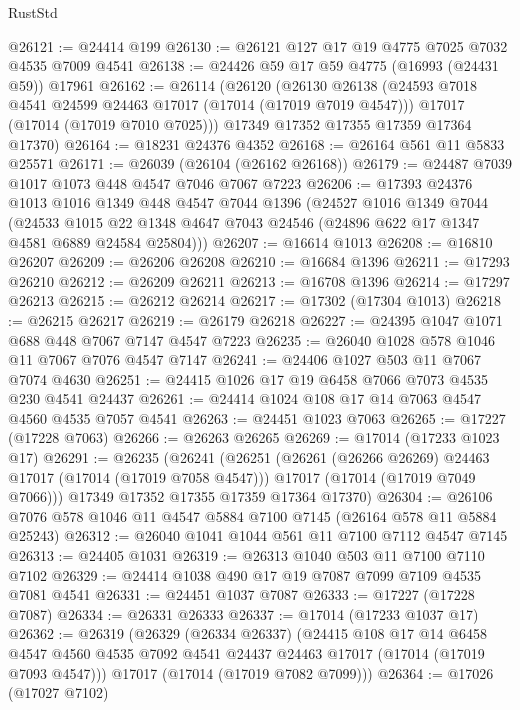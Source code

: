 \begin{lexlean}{RustStd}
\begin{coremodule}
@26121 := @24414 @199
@26130 := @26121 @127 @17 @19 @4775 @7025 @7032 @4535 @7009 @4541
@26138 := @24426 @59 @17 @59 @4775 (@16993 (@24431 @59)) @17961
@26162 := @26114
    (@26120
      (@26130
        @26138
        (@24593 @7018 @4541 @24599 @24463 @17017 (@17014 (@17019 @7019 @4547)))
        @17017
        (@17014 (@17019 @7010 @7025)))
      @17349
      @17352
      @17355
      @17359
      @17364
      @17370)
@26164 := @18231 @24376 @4352
@26168 := @26164 @561 @11 @5833 @25571
@26171 := @26039 (@26104 (@26162 @26168))
@26179 := @24487 @7039 @1017 @1073 @448 @4547 @7046 @7067 @7223
@26206 := @17393
    @24376
    @1013
    @1016
    @1349
    @448
    @4547
    @7044
    @1396
    (@24527
      @1016
      @1349
      @7044
      (@24533 @1015 @22 @1348 @4647 @7043 @24546 (@24896 @622 @17 @1347 @4581 @6889 @24584 @25804)))
@26207 := @16614 @1013
@26208 := @16810 @26207
@26209 := @26206 @26208
@26210 := @16684 @1396
@26211 := @17293 @26210
@26212 := @26209 @26211
@26213 := @16708 @1396
@26214 := @17297 @26213
@26215 := @26212 @26214
@26217 := @17302 (@17304 @1013)
@26218 := @26215 @26217
@26219 := @26179 @26218
@26227 := @24395 @1047 @1071 @688 @448 @7067 @7147 @4547 @7223
@26235 := @26040 @1028 @578 @1046 @11 @7067 @7076 @4547 @7147
@26241 := @24406 @1027 @503 @11 @7067 @7074 @4630
@26251 := @24415 @1026 @17 @19 @6458 @7066 @7073 @4535 @230 @4541 @24437
@26261 := @24414 @1024 @108 @17 @14 @7063 @4547 @4560 @4535 @7057 @4541
@26263 := @24451 @1023 @7063
@26265 := @17227 (@17228 @7063)
@26266 := @26263 @26265
@26269 := @17014 (@17233 @1023 @17)
@26291 := @26235
    (@26241
      (@26251
        (@26261 (@26266 @26269) @24463 @17017 (@17014 (@17019 @7058 @4547)))
        @17017
        (@17014 (@17019 @7049 @7066)))
      @17349
      @17352
      @17355
      @17359
      @17364
      @17370)
@26304 := @26106 @7076 @578 @1046 @11 @4547 @5884 @7100 @7145 (@26164 @578 @11 @5884 @25243)
@26312 := @26040 @1041 @1044 @561 @11 @7100 @7112 @4547 @7145
@26313 := @24405 @1031
@26319 := @26313 @1040 @503 @11 @7100 @7110 @7102
@26329 := @24414 @1038 @490 @17 @19 @7087 @7099 @7109 @4535 @7081 @4541
@26331 := @24451 @1037 @7087
@26333 := @17227 (@17228 @7087)
@26334 := @26331 @26333
@26337 := @17014 (@17233 @1037 @17)
@26362 := @26319
    (@26329
      (@26334 @26337)
      (@24415
        @108
        @17
        @14
        @6458
        @4547
        @4560
        @4535
        @7092
        @4541
        @24437
        @24463
        @17017
        (@17014 (@17019 @7093 @4547)))
      @17017
      (@17014 (@17019 @7082 @7099)))
@26364 := @17026 (@17027 @7102)

\end{coremodule}
\end{lexlean}
